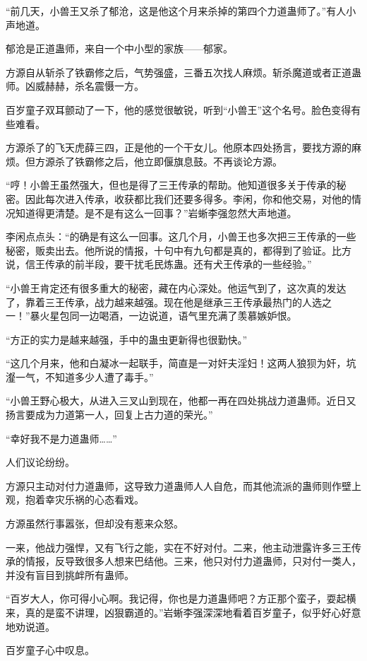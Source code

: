 \begin{this_body}
“前几天，小兽王又杀了郁沧，这是他这个月来杀掉的第四个力道蛊师了。”有人小声地道。

郁沧是正道蛊师，来自一个中小型的家族——郁家。

方源自从斩杀了铁霸修之后，气势强盛，三番五次找人麻烦。斩杀魔道或者正道蛊师。凶威赫赫，杀名震慑一方。

百岁童子双耳颤动了一下，他的感觉很敏锐，听到“小兽王”这个名号。脸色变得有些难看。

方源杀了的飞天虎薛三四，正是他的一个干女儿。他原本四处扬言，要找方源的麻烦。但方源杀了铁霸修之后，他立即偃旗息鼓。不再谈论方源。

“哼！小兽王虽然强大，但也是得了三王传承的帮助。他知道很多关于传承的秘密。因此每次进入传承，收获都比我们还要多得多。李闲，你和他交易，对他的情况知道得更清楚。是不是有这么一回事？”岩蜥李强忽然大声地道。

李闲点点头：“的确是有这么一回事。这几个月，小兽王也多次把三王传承的一些秘密，贩卖出去。他所说的情报，十句中有九句都是真的，都得到了验证。比方说，信王传承的前半段，要干扰毛民炼蛊。还有犬王传承的一些经验。”

“小兽王肯定还有很多重大的秘密，藏在内心深处。他运气到了，这次真的发达了，靠着三王传承，战力越来越强。现在他是继承三王传承最热门的人选之一！”暴火星包同一边喝酒，一边说道，语气里充满了羡慕嫉妒恨。

“方正的实力是越来越强，手中的蛊虫更新得也很勤快。”

“这几个月来，他和白凝冰一起联手，简直是一对奸夫淫妇！这两人狼狈为奸，坑瀣一气，不知道多少人遭了毒手。”

“小兽王野心极大，从进入三叉山到现在，他都一再在四处挑战力道蛊师。近日又扬言要成为力道第一人，回复上古力道的荣光。”

“幸好我不是力道蛊师……”

人们议论纷纷。

方源只主动对付力道蛊师，这导致力道蛊师人人自危，而其他流派的蛊师则作壁上观，抱着幸灾乐祸的心态看戏。

方源虽然行事嚣张，但却没有惹来众怒。

一来，他战力强悍，又有飞行之能，实在不好对付。二来，他主动泄露许多三王传承的情报，反导致很多人想来巴结他。三来，他只对付力道蛊师，只对付一类人，并没有盲目到挑衅所有蛊师。

“百岁大人，你可得小心啊。我记得，你也是力道蛊师吧？方正那个蛮子，耍起横来，真的是蛮不讲理，凶狠霸道的。”岩蜥李强深深地看着百岁童子，似乎好心好意地劝说道。

百岁童子心中叹息。


\end{this_body}
